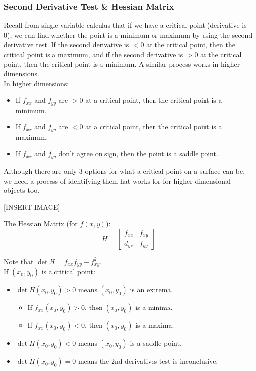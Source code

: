 \subsubsection{Second Derivative Test \& Hessian Matrix}
\noindent
Recall from single-variable calculus that if we have a critical point (derivative is 0), we can find whether the point is a minimum or maximum by using the second derivative test. If the second derivative is $<0$ at the critical point, then the critical point is a maximum, and if the second derivative is $> 0$ at the critical point, then the critical point is a minimum. A similar process works in higher dimensions.\\

\noindent
In higher dimensions:
\begin{itemize}
	\item If $f_{xx}$ and $f_{yy}$ are $> 0$ at a critical point, then the critical point is a minimum.
	\item If $f_{xx}$ and $f_{yy}$ are $< 0$ at a critical point, then the critical point is a maximum.
	\item If $f_{xx}$ and $f_{yy}$ don't agree on sign, then the point is a saddle point.
\end{itemize}

\noindent
Although there are only 3 options for what a critical point on a surface can be, we need a process of identifying them hat works for for higher dimensional objects too.

[INSERT IMAGE]

\begin{definition}
	The Hessian Matrix (for $f(x,y)$):
	\begin{equation*}
		H = \begin{bmatrix}
			f_{xx} & f_{xy} \\
			d_{yx} & f_{yy} 
		\end{bmatrix}
	\end{equation*} 
\end{definition}
\noindent
Note that $\det{H} = f_{xx}f_{yy} - f_{xy}^2$.\\

\noindent
If $(x_0, y_0)$ is a critical point:
\begin{itemize}
	\item $\det{H(x_0,y_0) > 0}$ means $(x_0, y_0)$ is an extrema. 
	\begin{itemize}
		\item If $f_{xx}(x_0, y_0) > 0$, then $(x_0, y_0)$ is a minima.
		\item If $f_{xx}(x_0, y_0) < 0$, then $(x_0, y_0)$ is a maxima.
	\end{itemize}
	\item $\det{H(x_0, y_0)} < 0$ means $(x_0, y_0)$ is a saddle point.
	\item $\det{H(x_0, y_0)} = 0$ means the 2nd derivatives test is inconclusive.
\end{itemize}
